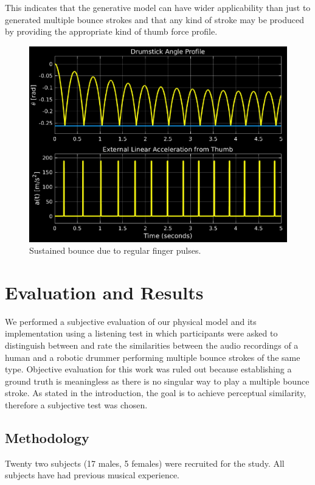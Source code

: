 \documentclass[final,1p,times]{elsarticle}
\begin{document}
This indicates that the generative model can have wider applicability than just to generated multiple bounce strokes and that any kind of stroke may be produced by providing the appropriate kind of thumb force profile.
\begin{figure}[H]
	\begin{center}
		\includegraphics[scale =0.67]{./figures/Fig7.eps}
		\caption{Sustained bounce due to regular finger pulses.}
		\label{SB}
	\end{center}
\end{figure}
\section{Evaluation and Results}
We performed a subjective evaluation of our physical model and its implementation using a listening test in which participants were asked to distinguish between and rate the similarities between the audio recordings of a human and a robotic drummer performing multiple bounce strokes of the same type. Objective evaluation for this work was ruled out because establishing a ground truth is meaningless as there is no singular way to play a multiple bounce stroke. As stated in the introduction, the goal is to achieve perceptual similarity, therefore a subjective test was chosen. 

\subsection{Methodology}
Twenty two subjects (17 males, 5 females) were recruited for the study.
All subjects have had previous musical experience.
\end{document}
